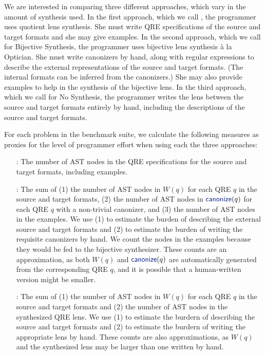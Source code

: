 \documentclass[12pt]{article}
\begin{document}
{We are interested in comparing three different approaches, which vary
in the amount of synthesis used. 
In the first approach, which we call \QRESize{}, the programmer uses
quotient lens synthesis.  She must write QRE specifications of the source and
target formats and she may give examples.
In the second approach, which we call \canonizeAndSpecSize{} for
Bijective Synthesis, the
programmer uses bijective lens synthesis \`a la Optician.
She must write canonizers by hand, along with 
regular expressions to describe the external
representations of the source and target formats. (The internal
formats can be inferred from the canonizers.) She may also
provide examples to help in the synthesis of the bijective lens.
In the third approach, which we call \LensAndSpecSize{} for No Synthesis, the
programmer writes the lens between the source and target formats
entirely by hand, including the descriptions of the source and target
formats.

For each problem in the benchmark suite, we calculate the following
measures as proxies for the level of programmer effort when using each
the three approaches:

%
\begin{itemize}
  \item[\QRESize{}:] 
  The number of AST nodes in the QRE specifications for the source and
  target formats, including examples. 
  \item[\canonizeAndSpecSize{}:] 
  The sum of (1) the number of AST nodes in $W(q)$ for each QRE $q$ in the source and target
  formats, (2) the number of AST nodes in $\canonize(q)$ for each QRE $q$ with a
  non-trivial canonizer, and (3) the number of AST nodes in the
  examples.  We use (1) to estimate the burden of describing
  the external source and target formats and (2) to estimate the
  burden of writing the requisite canonizers
  by hand.  We count the nodes in the examples because they would be
  fed to the bijective synthesizer.  
  These counts are an approximation, as both $W(q)$ and $\canonize(q)$ are
  automatically generated from the corresponding QRE $q$, and it is
  possible that a human-written version might be smaller.
  \item[\LensAndSpecSize{}:] The sum of (1) the number of AST nodes in
  $W(q)$ for each QRE $q$ in the source and target formats and (2) the
  number of AST nodes in the synthesized QRE lens.  We use (1) to
  estimate the burdern of describing the source and target formats
  and (2) to estimate the burdern of writing the appropriate lens by
  hand. These counts are also approximations, as
  $W(q)$ and the synthesized lens may be larger than one written by hand.
\end{itemize}

}
\end{document}
